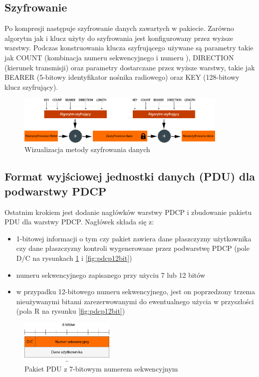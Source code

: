 \subsection{Szyfrowanie}

Po kompresji następuje szyfrowanie danych zawartych w pakiecie. Zarówno algorytm jak i klucz użyty do szyfrowania jest konfigurowany przez wyższe warstwy. Podczas konstruowania klucza szyfrującego używane są parametry takie jak COUNT (kombinacja numeru sekwencyjnego i numeru ), DIRECTION (kierunek transmisji) oraz parametry dostarczane przez wyższe warstwy, takie jak BEARER (5-bitowy identyfikator nośnika radiowego) oraz KEY (128-bitowy klucz szyfrujący).

\begin{figure}[ht]
	\centerline{\includegraphics[width=0.9\textwidth]{images/pdcp-eps.png}}
	\caption{Wizualizacja metody szyfrowania danych}
\end{figure}

\subsection{Format wyjściowej jednostki danych (PDU) dla podwarstwy PDCP}

Ostatnim krokiem jest dodanie nagłówków warstwy PDCP i zbudowanie pakietu PDU dla warstwy PDCP. Nagłówek składa się z:
\begin{itemize}
	\item 1-bitowej informacji o tym czy pakiet zawiera dane płaszczyzny użytkownika czy dane płaszczyzny kontroli wygenerowane przez podwarstwę PDCP (pole D/C na rysunkach \ref{fig:pdcp7bit} i \ref{fig:pdcp12bit})
	\item numeru sekwencyjnego zapisanego przy użyciu 7 lub 12 bitów
	\item w przypadku 12-bitowego numeru sekwencyjnego, jest on poprzedzony trzema nieużywanymi bitami zarezerwowanymi do ewentualnego użycia w przyszłości (pola R na rysunku \ref{fig:pdcp12bit})
\end{itemize}

\begin{figure}[ht]
	\centerline{\includegraphics[width=0.4\textwidth]{images/pdcp-pdu-7bit.png}}
	\caption{Pakiet PDU z 7-bitowym numerem sekwencyjnym}
	\label{fig:pdcp7bit}
\end{figure}

